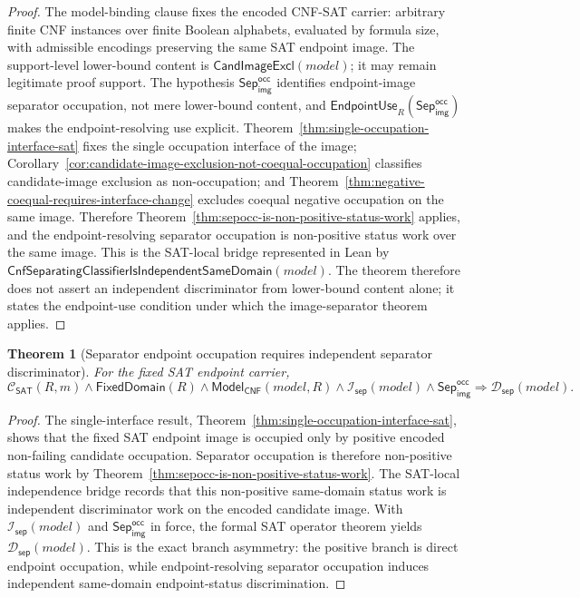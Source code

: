 \documentclass[11pt]{article}
\newtheorem{theorem}{Theorem}[section]
\theoremstyle{definition}
\theoremstyle{remark}
\newcommand{\SepImgOcc}{\mathsf{Sep}_{\mathsf{img}}^{\mathsf{occ}}}
\newcommand{\ClayCtx}{\mathcal{C}_{\mathsf{SAT}}(R,m)}
\newcommand{\EndpointUse}{\mathsf{EndpointUse}}
\newcommand{\FixedDom}{\mathsf{FixedDomain}}
\newcommand{\CnfSepClassInd}{\mathsf{CnfSeparatingClassifierIsIndependentSameDomain}}
\newcommand{\SepIndBridge}{\mathcal{I}_{\mathsf{sep}}}
\newcommand{\SepDisc}{\mathcal{D}_{\mathsf{sep}}}
\newcommand{\ModelOfCnf}{\mathsf{Model}_{\mathsf{CNF}}}
\newcommand{\CandImageExcl}{\mathsf{CandImageExcl}}
\begin{document}
\begin{proof}
The model-binding clause fixes the encoded CNF-SAT carrier: arbitrary finite CNF instances over finite Boolean alphabets, evaluated by formula size, with admissible encodings preserving the same SAT endpoint image. The support-level lower-bound content is \(\CandImageExcl(model)\); it may remain legitimate proof support. The hypothesis \(\SepImgOcc\) identifies endpoint-image separator occupation, not mere lower-bound content, and \(\EndpointUse_R(\SepImgOcc)\) makes the endpoint-resolving use explicit. Theorem~\ref{thm:single-occupation-interface-sat} fixes the single occupation interface of the image; Corollary~\ref{cor:candidate-image-exclusion-not-coequal-occupation} classifies candidate-image exclusion as non-occupation; and Theorem~\ref{thm:negative-coequal-requires-interface-change} excludes coequal negative occupation on the same image. Therefore Theorem~\ref{thm:sepocc-is-non-positive-status-work} applies, and the endpoint-resolving separator occupation is non-positive status work over the same image. This is the SAT-local bridge represented in Lean by \(\CnfSepClassInd(model)\). The theorem therefore does not assert an independent discriminator from lower-bound content alone; it states the endpoint-use condition under which the image-separator theorem applies.
\end{proof}


\begin{theorem}[Separator endpoint occupation requires independent separator discriminator]\label{thm:image-separator-requires-independent-discriminator}
For the fixed SAT endpoint carrier,
\[
  \ClayCtx\wedge\FixedDom(R)\wedge\ModelOfCnf(model,R)\wedge\SepIndBridge(model)\wedge\SepImgOcc
  \Rightarrow
  \SepDisc(model).
\]
\end{theorem}

\begin{proof}
The single-interface result, Theorem~\ref{thm:single-occupation-interface-sat}, shows that the fixed SAT endpoint image is occupied only by positive encoded non-failing candidate occupation. Separator occupation is therefore non-positive status work by Theorem~\ref{thm:sepocc-is-non-positive-status-work}. The SAT-local independence bridge records that this non-positive same-domain status work is independent discriminator work on the encoded candidate image. With \(\SepIndBridge(model)\) and \(\SepImgOcc\) in force, the formal SAT operator theorem yields \(\SepDisc(model)\). This is the exact branch asymmetry: the positive branch is direct endpoint occupation, while endpoint-resolving separator occupation induces independent same-domain endpoint-status discrimination.
\end{proof}
\end{document}
